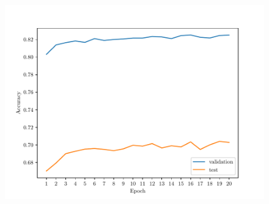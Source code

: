 \documentclass{exam}
\begin{document}
\begin{questions}
\begin{parts}
            \vspace{-2.5em}
            \begin{figure}[H]
                \centering
                \includegraphics[scale = 0.75]{logistic_regression.pdf}
            \end{figure}

        \end{parts}

        \question
        \begin{parts}


\end{parts}
\end{questions}
\end{document}

